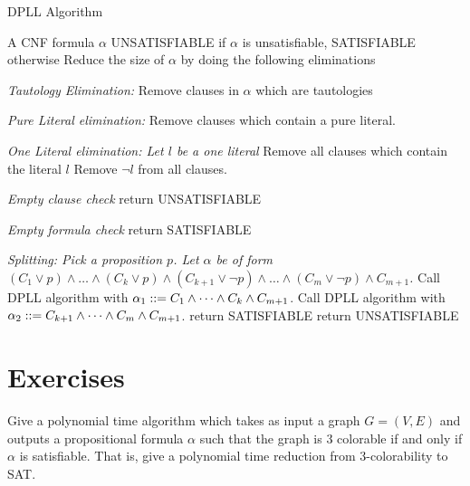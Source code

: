 \begin{algorithm}[h]
 \caption{DPLL Algorithm}
 \label{alg:dpll}
 \begin{algorithmic}[1]
 \renewcommand{\algorithmicrequire}{\textbf{Input:}}
 \renewcommand{\algorithmicensure}{\textbf{Output:}}
 \REQUIRE A CNF formula $\alpha$ 
 \ENSURE  UNSATISFIABLE if $\alpha$ is unsatisfiable, SATISFIABLE otherwise
 \REPEAT  
 		\STATE Reduce the size of $\alpha$ by doing the following eliminations
 		
 		{\emph{ Tautology Elimination:}}
		 \STATE Remove clauses in $\alpha$ which are tautologies
		 
		{\emph{Pure Literal elimination:}}
		\STATE Remove clauses which contain a pure literal.
		
		\emph{One Literal elimination: Let $l$ be a one literal}
		\STATE Remove all clauses which contain the literal $l$
		\STATE Remove  $\neg l$ from all clauses.
		
		\emph{Empty clause check}		
				\STATE return UNSATISFIABLE
		\ENDIF
		
		\emph{Empty formula check}
				\STATE return SATISFIABLE
		\ENDIF
{}

\emph{Splitting: Pick a proposition $p$. Let $\alpha$ be of form $(C_1 \vee p) \wedge \dots \wedge (C_k \vee p) \wedge (C_{k+1} \vee \neg p) \wedge \dots \wedge (C_m \vee \neg p) \wedge C_{m+1}$.}
\STATE Call DPLL algorithm with $\alpha_1 ::= C_1 \wedge \dots \wedge C_k \wedge C_{m+1}$.
\STATE Call DPLL algorithm with $\alpha_2 ::= C_{k+1} \wedge \dots \wedge C_m \wedge C_{m+1}$.
		\STATE return SATISFIABLE
\ELSE
		\STATE return UNSATISFIABLE 
\ENDIF
 \end{algorithmic} 
 \end{algorithm}


\section{Exercises}

\begin{exercise}
Give a polynomial time algorithm which takes as input a graph $G=(V,E)$ and outputs a propositional formula $\alpha$ such that the graph is $3$ colorable if and only if $\alpha$ is satisfiable. That is, give a polynomial time reduction from $3$-colorability to SAT.
\end{exercise}

